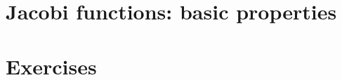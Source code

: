 \section{Jacobi  functions: basic properties}
\label{app:appD-jacobi-functions}
 


\section{Exercises}
\label{sec:appD-exercises}
 
